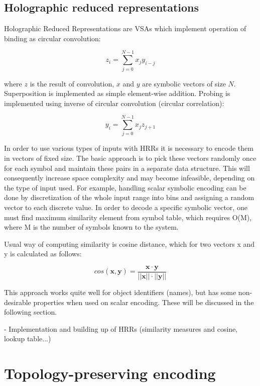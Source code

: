 \documentclass[conference]{IEEEtran}
\begin{document}
	\subsection{Holographic reduced representations}
	\label{sec:hrr}
	
	Holographic Reduced Representations are VSAs which implement operation of binding as circular convolution:
	
	\begin{equation}
	z_i=\sum_{j=0}^{N-1}{x_jy_{i-j}} 
	\end{equation}
	
	where $z$ is the result of convolution, $x$ and $y$ are symbolic vectors of size $N$.
Superposition is implemented as simple element-wise addition.
Probing is implemented using inverse of circular convolution (circular correlation):
	
	\begin{equation}
	y_i=\sum_{j=0}^{N-1}{x_jz_{j+1}} 
	\end{equation} 
	
	In order to use various types of inputs with HRRs it is necessary to encode them in vectors of fixed size.
	The basic approach is to pick these vectors randomly once for each symbol and maintain these pairs in a separate data structure.
	This will consequently increase space complexity and may become infeasible, depending on the type of input used. For example, handling scalar symbolic encoding can be done by discretization of the whole input range into bins and assigning a random vector to each discrete value. In order to decode a specific symbolic vector, one must find maximum similarity element from symbol table, which requires O(M), where M is the number of symbols known to the system.
	
	Usual way of computing similarity is cosine distance, which for two vectors \pmb x and \pmb y is calculated as follows:
	
	\begin{equation}
cos(\pmb x, \pmb y) = \frac {\pmb x \cdot \pmb y}{||\pmb x|| \cdot ||\pmb y||}
	\end{equation} 
	
	This approach works quite well for object identifiers (names), but has some non-desirable properties when used on scalar encoding. These will be discussed in the following section.
	
	- Implementation and building up of HRRs (similarity measures and cosine, lookup table...)
	
	
	\section{Topology-preserving encoding}
	
\end{document}
